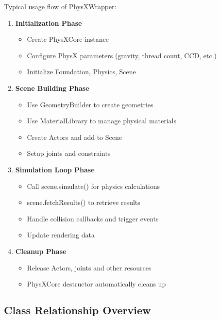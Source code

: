 Typical usage flow of PhysXWrapper:

\begin{enumerate}
    \item \textbf{Initialization Phase}
    \begin{itemize}
        \item Create PhysXCore instance
        \item Configure PhysX parameters (gravity, thread count, CCD, etc.)
        \item Initialize Foundation, Physics, Scene
    \end{itemize}

    \item \textbf{Scene Building Phase}
    \begin{itemize}
        \item Use GeometryBuilder to create geometries
        \item Use MaterialLibrary to manage physical materials
        \item Create Actors and add to Scene
        \item Setup joints and constraints
    \end{itemize}

    \item \textbf{Simulation Loop Phase}
    \begin{itemize}
        \item Call scene.simulate() for physics calculations
        \item scene.fetchResults() to retrieve results
        \item Handle collision callbacks and trigger events
        \item Update rendering data
    \end{itemize}

    \item \textbf{Cleanup Phase}
    \begin{itemize}
        \item Release Actors, joints and other resources
        \item PhysXCore destructor automatically cleans up
    \end{itemize}
\end{enumerate}

\subsection{Class Relationship Overview}


